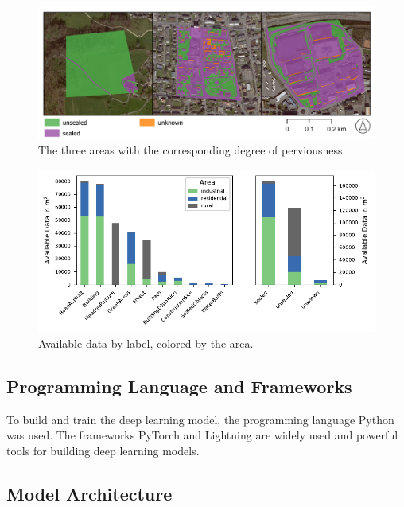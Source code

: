 \begin{figure}[H]
    \centering
    \captionsetup{width=0.8\linewidth}
    \includegraphics[width=\linewidth]{figures/map_aoi_sealing.pdf}
    \caption{The three areas with the corresponding degree of perviousness.}
    \label{fig:sealed_areas}
\end{figure}

\begin{figure}[H]
    \centering
    \captionsetup{width=0.8\linewidth}
    \includegraphics{figures/area_by_category_and_seal.pdf}
    \caption{Available data by label, colored by the area.}
    \label{fig:label_distribution}
\end{figure}

\subsection{Programming Language and Frameworks}%

To build and train the deep learning model, the programming language Python was used.
The frameworks PyTorch and Lightning are widely used and powerful tools for building
deep learning models.

\subsection{Model Architecture}%

